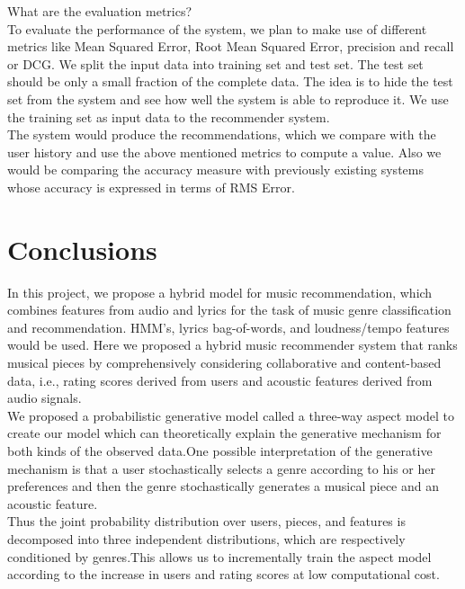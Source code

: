 \documentclass{sig-alternate-05-2015}
\begin{document}
What are the evaluation metrics? \\

To evaluate the performance of the system, we plan to make use of different metrics like Mean Squared Error, Root Mean Squared Error, precision and recall or DCG. We split the input data into training set and test set. The test set should be only a small fraction of the complete data. The idea is to hide the test set from the system and see how well the system is able to reproduce it. We use the training set as input data to the recommender system.\\

The system would produce the recommendations, which we compare with the user history and use the above mentioned metrics to compute a value. Also we would be comparing the accuracy measure with previously existing systems whose accuracy is expressed in terms of RMS Error.


\section{Conclusions}

In this project, we propose a hybrid model for music recommendation, which combines features from audio and lyrics for the task of music genre classification and recommendation. HMM's, lyrics bag-of-words, and loudness/tempo features would be used. Here we proposed a hybrid music recommender system that ranks musical pieces by comprehensively considering collaborative and content-based data, i.e., rating scores derived from users and acoustic features derived from audio signals.\\

We proposed a probabilistic generative model called a three-way aspect model to create our model which can theoretically explain the generative mechanism for both kinds of the observed data.One possible interpretation of the generative mechanism is that a user stochastically selects a genre according to his or her preferences and then the genre stochastically generates a musical piece and an acoustic feature.\\

Thus the joint probability distribution over users, pieces, and features is decomposed into three independent distributions, which are respectively conditioned by genres.This allows us to incrementally train the aspect model according to the increase in users and rating scores at low computational cost.\\
\end{document}
